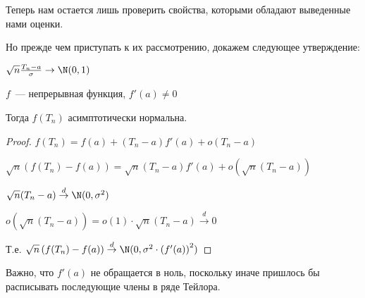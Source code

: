 Теперь нам остается лишь проверить свойства, которыми обладают выведенные нами оценки.

Но прежде чем приступать к их рассмотрению, докажем следующее утверждение:

\begin{statement}
	\slashns
	
	$\sqrt{n} \frac{T_n - a}{\sigma} \to \N(0, 1)$
	
	$f$~--- непрерывная функция, $f'(a) \ne 0$
	
	Тогда $f(T_n)$ асимптотически нормальна.
	
	\begin{proof}
		\slashns
		
		$f(T_n) = f(a) + (T_n - a) f'(a) + o(T_n - a)$
		
		$\sqrt{n} \left(f(T_n) - f(a) \right) = \sqrt{n} (T_n - a) f'(a) + o\left(\sqrt{n} (T_n - a) \right)$
		
		$\sqrt{n} (T_n - a) \overset{d}{\to} \N(0, \sigma^2)$
		
		$o\left(\sqrt{n} (T_n - a) \right) = o(1) \cdot \sqrt{n} (T_n - a) \overset{d}{\to} 0$
		
		Т.е. $\sqrt{n} \left(f(T_n) - f(a) \right) \overset{d}{\to} \N(0, \sigma^2 \cdot \left(f'(a) \right)^2)$
	\end{proof}
\end{statement}

\begin{remark}
	\slashns
	
	Важно, что $f'(a)$ не обращается в ноль, поскольку иначе пришлось бы расписывать последующие члены в ряде Тейлора.
\end{remark}


